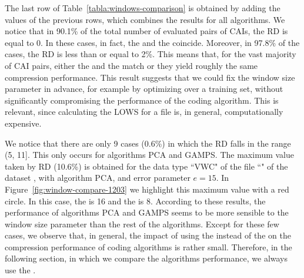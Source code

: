 The last row of Table~\ref{tabla:windows-comparison} is obtained by adding the values of the previous rows, which combines the results for all algorithms. We notice that in 90.1\% of the total number of evaluated pairs of CAIs, the RD is equal to 0. In these cases, in fact, the \ows and the \lows coincide. Moreover, in 97.8\% of the cases, the RD is less than or equal to 2\%. This means that, for the vast majority of CAI pairs, either the \ows and the \lows match or they yield roughly the same compression performance. This result suggests that we could fix the window size parameter in advance, for example by optimizing over a training set, without significantly compromising the performance of the coding algorithm. This is relevant, since calculating the LOWS for a file is, in general, computationally expensive.


We notice that there are only 9 cases (0.6\%) in which the RD falls in the range (5, 11]. This only occurs for algorithms PCA and GAMPS. The maximum value taken by RD (10.6\%) is obtained for the data type ``VWC" of the file ``\fileIrkisTwo" of the dataset \datasetirkis, with algorithm PCA, and error parameter $e=15$. In Figure~\ref{fig:window-compare-1203} we highlight this maximum value with a red circle. In this case, the \ows is 16 and the \lows is 8. According to these results, the performance of algorithms PCA and GAMPS seems to be more sensible to the window size parameter than the rest of the algorithms. Except for these few cases, we observe that, in general, the impact of using the \ows instead of the \lows on the compression performance of coding algorithms is rather small. Therefore, in the following section, in which we compare the algorithms performance, we always use the \owsns.


\clearpage

